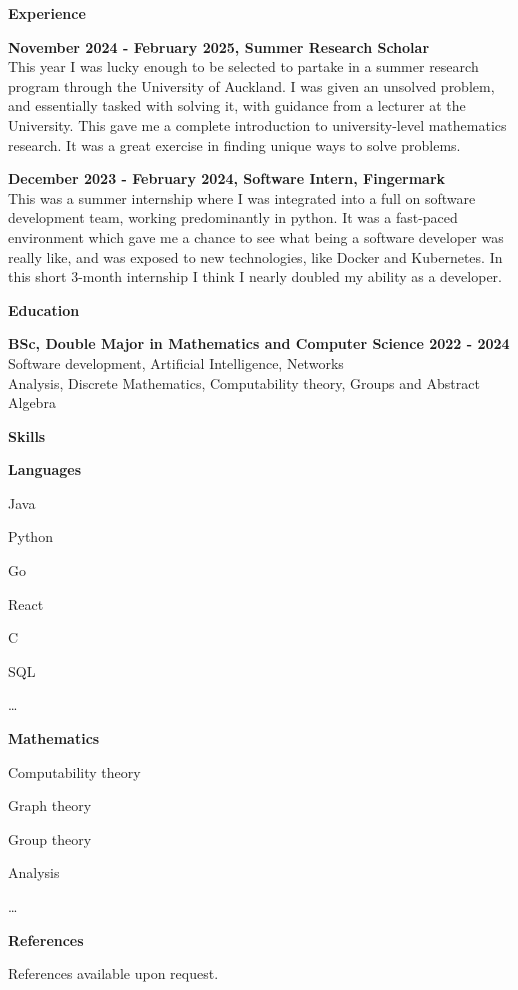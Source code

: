 \documentclass[a4paper,12pt,final]{memoir}
\newcommand{\Sep}{\vspace{1.5em}}
\newcommand{\SmallSep}{\vspace{0.5em}}
\newcommand{\CVSection}[1]
	{\Large\textbf{#1}\par
	\SmallSep\normalsize\normalfont}
\newcommand{\CVItem}[1]
	{\textbf{\color{RoyalBlue} #1}}
\begin{document}
\CVSection{Experience}
\CVItem{November 2024 - February 2025, Summer Research Scholar}\\
This year I was lucky enough to be selected to partake in a summer research program through the University of Auckland.
I was given an unsolved problem, and essentially tasked with solving it, with guidance from a lecturer at the University.
This gave me a complete introduction to university-level mathematics research. It was a great exercise in finding unique ways to solve 
problems.
\SmallSep

\CVItem{December 2023 - February 2024, Software Intern, Fingermark}\\
This was a summer internship where I was integrated into a full on software development team, working predominantly in python. It was a fast-paced environment which 
gave me a chance to see what being a software developer was really like, and 
was exposed to new technologies, like Docker and Kubernetes. In this short 3-month internship I think I nearly doubled my ability as a developer.
\Sep

\CVSection{Education}
\CVItem{BSc, Double Major in Mathematics and Computer Science 2022 - 2024}\\
Software development, Artificial Intelligence, Networks\\
Analysis, Discrete Mathematics, Computability theory, Groups and Abstract Algebra
\Sep

\CVSection{Skills}
\CVItem{Languages}
\begin{multicols}{3}
\begin{compactitem}[\color{RoyalBlue}$\circ$]
	\item Java
	\item Python
	\item Go
	\item React
	\item C
	\item SQL
	\item \ldots
\end{compactitem}
\end{multicols}
\CVItem{Mathematics}
\begin{multicols}{3}
\begin{compactitem}[\color{RoyalBlue}$\circ$]
	\item Computability theory
	\item Graph theory
	\item Group theory
	\item Analysis 
	\item \ldots
\end{compactitem}
\end{multicols}

\Sep 

\CVSection{References}
References available upon request.


\end{document}
